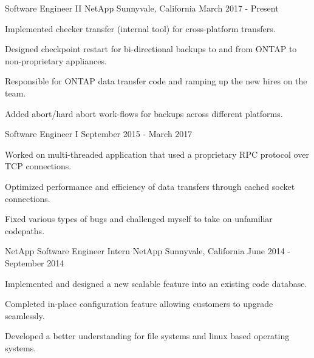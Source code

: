 


\begin{cventries}


\cventry
{Software Engineer II} %
{NetApp} %
{Sunnyvale, California} %
{March 2017 - Present} %
{ %
\begin{cvitems}
\item {Implemented checker transfer (internal tool) for cross-platform transfers.}
\item {Designed checkpoint restart for bi-directional backups to and from ONTAP to non-proprietary appliances.}
\item {Responsible for ONTAP data transfer code and ramping up the new hires on the team.}
\item {Added abort/hard abort work-flows for backups across different platforms.}
\end{cvitems}
}


\cventry
{Software Engineer I} %
{} %
{} %
{September 2015 - March 2017} %
{ %
\begin{cvitems}
\item {Worked on multi-threaded application that used a proprietary RPC protocol over TCP connections.}
\item {Optimized performance and efficiency of data transfers through cached socket connections.}
\item{Fixed various types of bugs and challenged myself to take on unfamiliar codepaths.}
\end{cvitems}
}


\cventry
{NetApp Software Engineer Intern} %
{NetApp} %
{Sunnyvale, California} %
{June 2014 - September 2014} %
{ %
\begin{cvitems}
\item {Implemented and designed a new scalable feature into an existing code database.}
\item {Completed in-place configuration feature allowing customers to upgrade seamlessly.}
\item {Developed a better understanding for file systems and linux based operating systems.}
\end{cvitems} 
}


\end{cventries}
